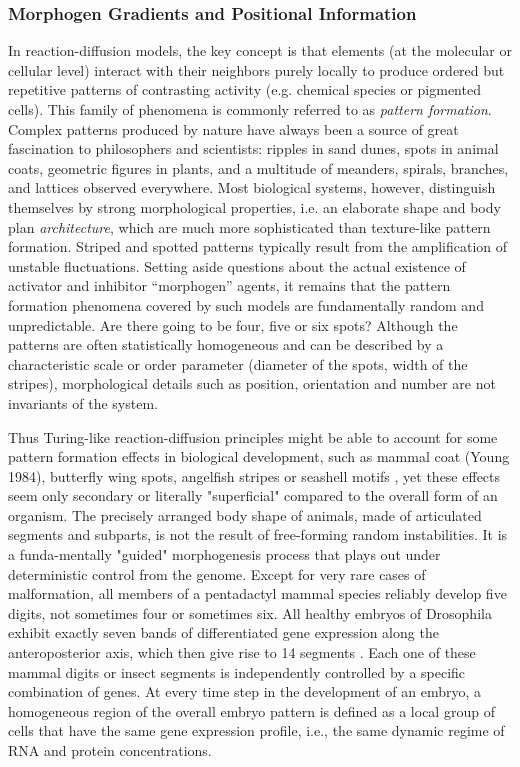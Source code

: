 \subsubsection{Morphogen Gradients and Positional Information}

  In reaction-diffusion models, the key concept is that elements (at the molecular or cellular level) interact with their neighbors purely locally to produce ordered but repetitive patterns of contrasting activity (e.g. chemical species or pigmented cells). This family of phenomena is commonly referred to as \textit{pattern formation}. Complex patterns produced by nature have always been a source of great fascination to philosophers and scientists: ripples in sand dunes, spots in animal coats, geometric figures in plants, and a multitude of meanders, spirals, branches, and lattices observed everywhere. Most biological systems, however, distinguish themselves by strong morphological properties, i.e. an elaborate shape and body plan \textit{architecture}, which are much more sophisticated than texture-like pattern formation. Striped and spotted patterns typically result from the amplification of unstable fluctuations. Setting aside questions about the actual existence of activator and inhibitor “morphogen” agents, it remains that the pattern formation phenomena covered by such models are fundamentally random and unpredictable. Are there going to be four, five or six spots? Although the patterns are often statistically homogeneous and can be described by a characteristic scale or order parameter (diameter of the spots, width of the stripes), morphological details such as position, orientation and number are not invariants of the system.  

  Thus Turing-like reaction-diffusion principles might be able to account for some pattern formation effects in biological development, such as mammal coat (Young 1984), butterfly wing spots, angelfish stripes \cite{Young:1984hd} or seashell motifs \cite{Meinhardt:1982tv}, yet these effects seem only secondary or literally "superficial" compared to the overall form of an organism. The precisely arranged body shape of animals, made of articulated segments and subparts, is not the result of free-forming random instabilities. It is a funda-mentally "guided" morphogenesis process that plays out under deterministic control from the genome. Except for very rare cases of malformation, all members of a pentadactyl mammal species reliably develop five digits, not sometimes four or sometimes six. All healthy embryos of Drosophila exhibit exactly seven bands of differentiated gene expression along the anteroposterior axis, which then give rise to 14 segments \cite{NussleinVolhard:1980wg}. Each one of these mammal digits or insect segments is independently controlled by a specific combination of genes. At every time step in the development of an embryo, a homogeneous region of the overall embryo pattern is defined as a local group of cells that have the same gene expression profile, i.e., the same dynamic regime of RNA and protein concentrations. 


